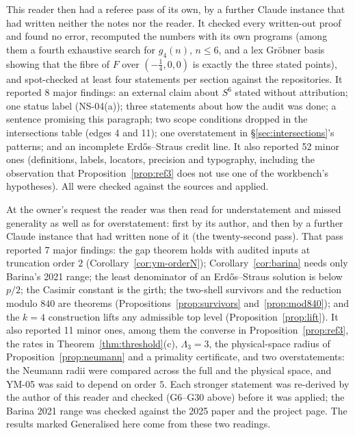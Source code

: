 This reader then had a referee pass of its own, by a further Claude instance that had written neither the notes nor the reader. It checked every written-out proof and found no error, recomputed the numbers with its own programs (among them a fourth exhaustive search for $g_4(n)$, $n\le6$, and a lex Gröbner basis showing that the fibre of $F$ over $(-\frac14,0,0)$ is exactly the three stated points), and spot-checked at least four statements per section against the repositories. It reported 8 major findings: an external claim about $S^6$ stated without attribution; one status label (NS-04(a)); three statements about how the audit was done; a sentence promising this paragraph; two scope conditions dropped in the intersections table (edges 4 and 11); one overstatement in §\ref{sec:intersections}'s patterns; and an incomplete Erdős--Straus credit line. It also reported 52 minor ones (definitions, labels, locators, precision and typography, including the observation that Proposition~\ref{prop:ref3} does not use one of the workbench's hypotheses). All were checked against the sources and applied.

At the owner's request the reader was then read for understatement and missed generality as well as for overstatement: first by its author, and then by a further Claude instance that had written none of it (the twenty-second pass). That pass reported 7 major findings: the gap theorem holds with audited inputs at truncation order $2$ (Corollary~\ref{cor:ym-orderN}); Corollary~\ref{cor:barina} needs only Barina's 2021 range; the least denominator of an Erdős--Straus solution is below $p/2$; the Casimir constant is the girth; the two-shell survivors and the reduction modulo $840$ are theorems (Propositions~\ref{prop:survivors} and~\ref{prop:mod840}); and the $k=4$ construction lifts any admissible top level (Proposition~\ref{prop:lift}). It also reported 11 minor ones, among them the converse in Proposition~\ref{prop:ref3}, the rates in Theorem~\ref{thm:threshold}(c), $\Lambda_3=3$, the physical-space radius of Proposition~\ref{prop:neumann} and a primality certificate, and two overstatements: the Neumann radii were compared across the full and the physical space, and YM-05 was said to depend on order $5$. Each stronger statement was re-derived by the author of this reader and checked (G6--G30 above) before it was applied; the Barina 2021 range was checked against the 2025 paper and the project page. The results marked \textsf{Generalised here} come from these two readings.


